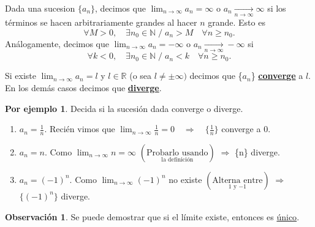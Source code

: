 \documentclass{article}
\theoremstyle{definition}
\theoremstyle{definition}
\newtheorem*{obs}{Observación}
\newtheorem*{ej}{Por ejemplo}
\theoremstyle{remark}
\begin{document}
\pagebreak
\begin{defi}
  Dada una sucesion $\{a _n\}$, decimos que $\lim_{n \to \infty}{a_n}=\infty$ o $a_n\underset{n\to\infty}{\longrightarrow}\infty$ si los términos se hacen arbitrariamente grandes al hacer $n$ grande. Esto es \[
    \forall M > 0, \quad \exists n_0 \in \mathbb{N} \; / \; a_n > M \quad \forall n \geq n_0.
  \]
  Análogamente, decimos que $\lim_{n\to\infty}{a_n}=-\infty$ o $a_n\underset{n\to\infty}{\longrightarrow}-\infty$ si
  \[
    \forall k<0, \quad \exists n_0 \in \mathbb{N} \; / \; a_n < k\quad \forall n \geq n_0.
  \]
\end{defi}
\begin{figure}[h]
\centering
\def\svgwidth{0.75\textwidth}

\end{figure}
\pagebreak
\begin{defi}
Si existe $\lim_{n \to \infty} a_n=l$ y $l \in \mathbb{R}$ (o sea $l \neq \pm \infty)$ decimos que \{$a_n$\} \textbf{\underline{converge}} a $l$. En los demás casos decimos que \underline{\textbf{diverge}}.
\end{defi}
\begin{ej}
Decida si la sucesión dada converge o diverge. \\
\begin{enumerate}
    \item $a_n=\frac{1}{n}$. Recién vimos que $\lim_{n \to \infty }{\frac{1}{n}}=0 \quad \Rightarrow \quad \{\frac{1}{n}\}$ converge a $0$.
    \item $a_n=n$. Como $\lim_{n\to \infty}{n}=\infty$ $\left(\underset{\text{la definición}}{\text{Probarlo usando}}\right)$
      $\Rightarrow$ \{n\} diverge.
    \item $a_n=(-1)^n$. Como $\lim_{n\to \infty}{(-1)^n}$ no existe $\left(\underset{\text{$1$ y $-1$}}{\text{Alterna entre}}\right)$ $\Rightarrow$ $\{(-1)^n\}$ diverge.
\end{enumerate}
\end{ej}

\begin{obs}
  Se puede demostrar que si el límite existe, entonces es \underline{único}.
\end{obs}


\pagebreak
\end{document}
